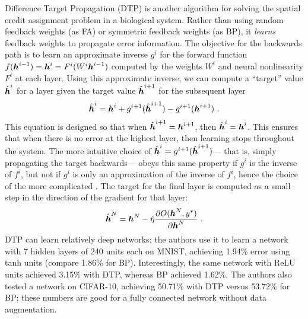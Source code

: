 Difference Target Propagation (DTP) \parencite{Lee2015a}
is another algorithm for solving the spatial credit assignment problem
in a biological system.
Rather than using random feedback weights (as FA)
or symmetric feedback weights (as BP),
it \emph{learns} feedback weights to propagate error information.
The objective for the backwards path is to learn an approximate inverse $g^i$
for the forward function $f(\boldsymbol{h}^{i-1}) = \boldsymbol{h}^i = F^i(W^i \boldsymbol{h}^{i-1})$
computed by the weights $W^i$ and neural nonlinearity $F^i$ at each layer.
Using this approximate inverse, we can compute a ``target'' value $\hat {\boldsymbol{h}}^i$
for a layer given the target value $\hat {\boldsymbol{h}}^{i+1}$ for the subsequent layer
\begin{align}
  \hat \vh^i = \vh^i + g^{i+1}(\hat \vh^{i+1}) - g^{i+1}(\vh^{i+1}) \text{ .}
  \eqnlabel{dtp}
\end{align}
This equation is designed so that when $\hat{\boldsymbol{h}}^{i+1} = \boldsymbol{h}^{i+1}$,
then $\hat{\boldsymbol{h}}^i = \boldsymbol{h}^i$.
This ensures that when there is no error at the highest layer,
then learning stops throughout the system.
The more intuitive choice of $\hat{\boldsymbol{h}}^i = g^{i+1}(\hat{\boldsymbol{h}}^{i+1})$---%
that is, simply propagating the target backwards---%
obeys this same property if $g^i$ is the inverse of $f^i$,
but not if $g^i$ is only an approximation of the inverse of $f^i$,
hence the choice of the more complicated .
The target for the final layer is computed as a small step
in the direction of the gradient for that layer:
\begin{align}
  \hat {\boldsymbol{h}}^N = \boldsymbol{h}^N - \hat\eta \frac{\partial O(\boldsymbol{h}^N, y^*)}{\partial \boldsymbol{h}^N} \text{ .}
\end{align}
DTP can learn relatively deep networks;
the authors use it to learn a network with 7 hidden layers of 240 units each
on MNIST, achieving 1.94\% error using tanh units (compare 1.86\% for BP).
Interestingly, the same network with ReLU units
achieved 3.15\% with DTP, whereas BP achieved 1.62\%.
The authors also tested a network on CIFAR-10,
achieving 50.71\% with DTP versus 53.72\% for BP;
these numbers are good for a fully connected network without data augmentation.

